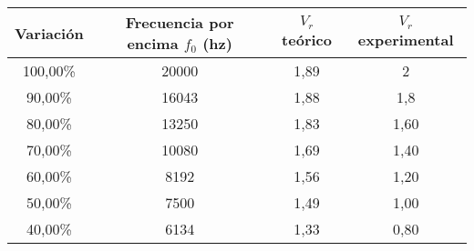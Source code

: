 \begin{tabular}{|c|c|c|c|}
\hline
Variación	&Frecuencia por encima $f_0$ (hz)	&$V_r$ teórico	&$V_r$ experimental\\ \hline
100,00\%	&20000	&1,89	&2\\
90,00\%	&16043  	&1,88	&1,8\\
80,00\%	&13250	    &1,83	&1,60\\
70,00\%	&10080	    &1,69	&1,40\\
60,00\%	&8192	&1,56	&1,20\\
50,00\%	&7500	&1,49	&1,00\\
40,00\%	&6134	&1,33	&0,80\\ \hline
\end{tabular}

